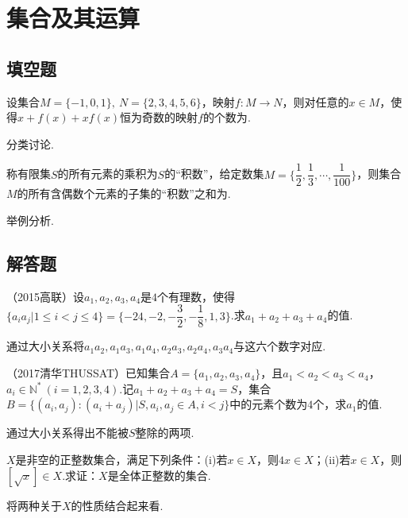 \documentclass[lang=cn, zihao=4.5]{elegantbook}
\newcommand{\tk}{\uline{\hspace{4em}}}
\begin{document}
\section{集合及其运算}

\subsection*{填空题}

\begin{example} %
	设集合$M=\{ -1,0,1 \} , ~N=\{ 2,3,4,5,6 \}$，映射$f:M \to N$，则对任意的$x \in M$，使得$x + f(x) +xf(x)$恒为奇数的映射$f$的个数为\tk .
\end{example}
\begin{hint}
	分类讨论.
\end{hint}

\begin{example}
	称有限集$S$的所有元素的乘积为$S$的“积数”，给定数集$M= \{ \dfrac{1}{2},\dfrac{1}{3}, \cdots ,\dfrac{1}{100} \}$，则集合$M$的所有含偶数个元素的子集的“积数”之和为\tk .
\end{example}
\begin{hint}
	举例分析.
\end{hint}

\subsection*{解答题}

\begin{example} %
	（2015高联）设$a_1,a_2,a_3,a_4$是$4$个有理数，使得$\{ a_ia_j | 1 \leq i < j \leq 4 \} = \{ -24,-2,-\dfrac{3}{2},-\dfrac{1}{8},1,3 \}$.求$a_1+a_2+a_3+a_4$的值.
\end{example}
\begin{hint}
	通过大小关系将$a_1a_2,a_1a_3,a_1a_4,a_2a_3,a_2a_4,a_3a_4$与这六个数字对应.
\end{hint}

\begin{example} %
	（2017清华THUSSAT）已知集合$A= \{ a_1,a_2,a_3,a_4 \}$，且$a_1 < a_2 < a_3 < a_4$，$a_i \in \mathbb{N} ^* ~(i=1,2,3,4)$.记$a_1+a_2+a_3+a_4=S$，集合$B = \{ (a_i,a_j) : (a_i+a_j) | S, a_i,a_j \in A, i<j \}$中的元素个数为$4$个，求$a_1$的值.
\end{example}
\begin{hint}
	通过大小关系得出不能被$S$整除的两项.
\end{hint}

\begin{example} %
	$X$是非空的正整数集合，满足下列条件：(i)若$x \in X$，则$4x \in X$；(ii)若$x \in X$，则$[\sqrt{x}] \in X$.求证：$X$是全体正整数的集合.
\end{example}
\begin{hint}
	将两种关于$X$的性质结合起来看.
\end{hint}
\end{document}
